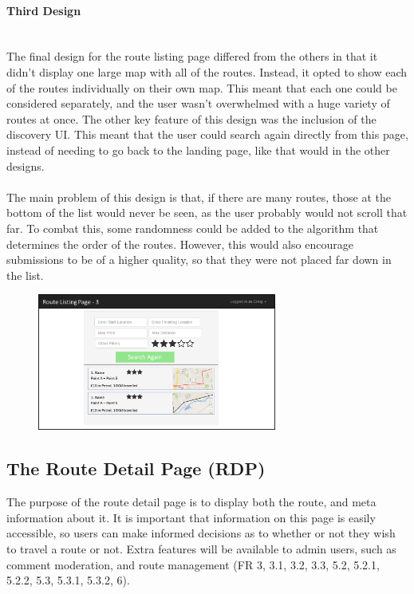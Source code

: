 \documentclass[a4paper,twoside,notitlepage,11pt]{article}
\begin{document}
\paragraph{Third Design}\ \\
The final design for the route listing page differed from the others in that it didn't display one large map with all of the routes. Instead, it opted to show each of the routes individually on their own map. This meant that each one could be considered separately, and the user wasn't overwhelmed with a huge variety of routes at once. The other key feature of this design was the inclusion of the discovery UI. This meant that the user could search again directly from this page, instead of needing to go back to the landing page, like that would in the other designs.\ \\
\ \\
The main problem of this design is that, if there are many routes, those at the bottom of the list would never be seen, as the user probably would not scroll that far. To combat this, some randomness could be added to the algorithm that determines the order of the routes. However, this would also encourage submissions to be of a higher quality, so that they were not placed far down in the list.
\begin{figure}[!ht]
	\begin{center}
		\includegraphics[width=0.7\textwidth]{images/ui-rlp-3.png}
	\end{center}
	\vspace{-9mm}
\end{figure}

\subsection{The Route Detail Page (RDP)}
The purpose of the route detail page is to display both the route, and meta information about it. It is important that information on this page is easily accessible, so users can make informed decisions as to whether or not they wish to travel a route or not. Extra features will be available to admin users, such as comment moderation, and route management (FR 3, 3.1, 3.2, 3.3, 5.2, 5.2.1, 5.2.2, 5.3, 5.3.1, 5.3.2, 6).
\end{document}
